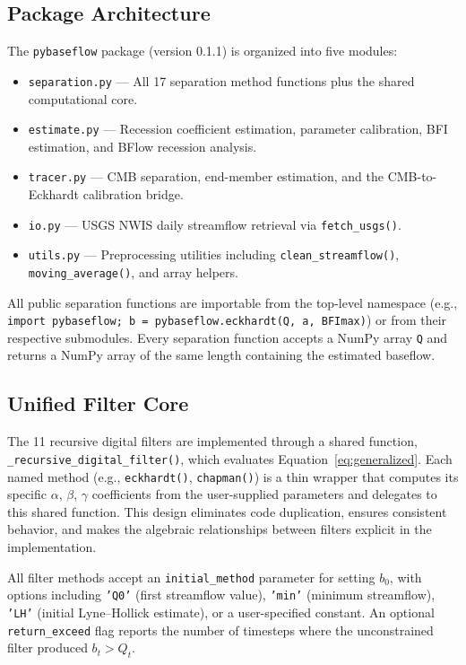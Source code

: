 \documentclass[hydrology,article,submit,pdftex,moreauthors]{Definitions/mdpi}
\begin{document}
\subsection{Package Architecture}
\label{sec:architecture}

The \texttt{pybaseflow} package (version 0.1.1) is organized into five modules:

\begin{itemize}[nosep]
\item \texttt{separation.py} --- All 17 separation method functions plus the shared computational core.
\item \texttt{estimate.py} --- Recession coefficient estimation, parameter calibration, BFI estimation, and BFlow recession analysis.
\item \texttt{tracer.py} --- CMB separation, end-member estimation, and the CMB-to-Eckhardt calibration bridge.
\item \texttt{io.py} --- USGS NWIS daily streamflow retrieval via \texttt{fetch\_usgs()}.
\item \texttt{utils.py} --- Preprocessing utilities including \texttt{clean\_streamflow()}, \texttt{moving\_average()}, and array helpers.
\end{itemize}

All public separation functions are importable from the top-level namespace (e.g., \texttt{import pybaseflow; b = pybaseflow.eckhardt(Q, a, BFImax)}) or from their respective submodules. Every separation function accepts a NumPy array \texttt{Q} and returns a NumPy array of the same length containing the estimated baseflow.

\subsection{Unified Filter Core}
\label{sec:filter_core}

The 11 recursive digital filters are implemented through a shared function, \texttt{\_recursive\_digital\_filter()}, which evaluates Equation~\ref{eq:generalized}. Each named method (e.g., \texttt{eckhardt()}, \texttt{chapman()}) is a thin wrapper that computes its specific $\alpha$, $\beta$, $\gamma$ coefficients from the user-supplied parameters and delegates to this shared function. This design eliminates code duplication, ensures consistent behavior, and makes the algebraic relationships between filters explicit in the implementation.

All filter methods accept an \texttt{initial\_method} parameter for setting $b_0$, with options including \texttt{'Q0'} (first streamflow value), \texttt{'min'} (minimum streamflow), \texttt{'LH'} (initial Lyne--Hollick estimate), or a user-specified constant. An optional \texttt{return\_exceed} flag reports the number of timesteps where the unconstrained filter produced $b_t > Q_t$.
\end{document}
